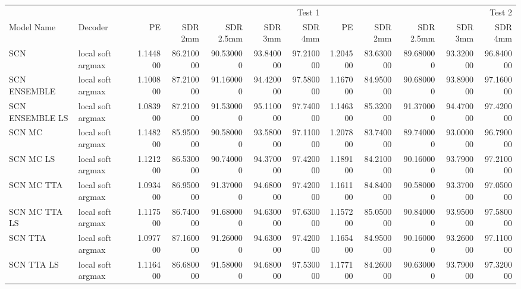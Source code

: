 \begin{tabular}{llrrrrrrrrrr}
\toprule
\multicolumn{2}{r}{} & \multicolumn{5}{r}{Test 1} & \multicolumn{5}{r}{Test 2} \\
Model Name & Decoder & PE & SDR 2mm & SDR 2.5mm & SDR 3mm & SDR 4mm & PE & SDR 2mm & SDR 2.5mm & SDR 3mm & SDR 4mm \\
\midrule
SCN & local soft argmax & 1.144800 & 86.210000 & 90.530000 & 93.840000 & 97.210000 & 1.204500 & 83.630000 & 89.680000 & 93.320000 & 96.840000 \\
SCN ENSEMBLE & local soft argmax & 1.100800 & 87.210000 & 91.160000 & 94.420000 & 97.580000 & 1.167000 & 84.950000 & 90.680000 & 93.890000 & 97.160000 \\
SCN ENSEMBLE LS & local soft argmax & 1.083900 & 87.210000 & 91.530000 & 95.110000 & 97.740000 & 1.146300 & 85.320000 & 91.370000 & 94.470000 & 97.420000 \\
SCN MC & local soft argmax & 1.148200 & 85.950000 & 90.580000 & 93.580000 & 97.110000 & 1.207800 & 83.740000 & 89.740000 & 93.000000 & 96.790000 \\
SCN MC LS & local soft argmax & 1.121200 & 86.530000 & 90.740000 & 94.370000 & 97.420000 & 1.189100 & 84.210000 & 90.160000 & 93.790000 & 97.210000 \\
SCN MC TTA & local soft argmax & 1.093400 & 86.950000 & 91.370000 & 94.680000 & 97.420000 & 1.161100 & 84.840000 & 90.580000 & 93.370000 & 97.050000 \\
SCN MC TTA LS & local soft argmax & 1.117500 & 86.740000 & 91.680000 & 94.630000 & 97.630000 & 1.157200 & 85.050000 & 90.840000 & 93.950000 & 97.580000 \\
SCN TTA & local soft argmax & 1.097700 & 87.160000 & 91.260000 & 94.630000 & 97.420000 & 1.165400 & 84.950000 & 90.160000 & 93.260000 & 97.110000 \\
SCN TTA LS & local soft argmax & 1.116400 & 86.680000 & 91.580000 & 94.680000 & 97.530000 & 1.177100 & 84.260000 & 90.630000 & 93.790000 & 97.320000 \\
\bottomrule
\end{tabular}
